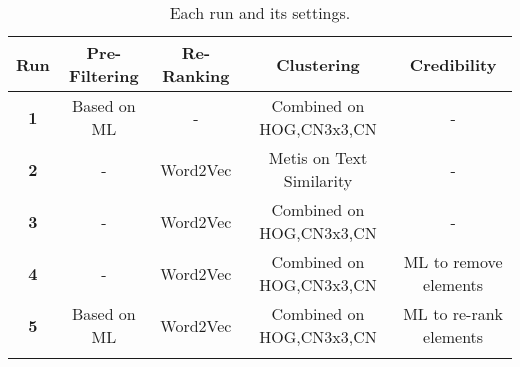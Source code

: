 
\begin{table*}[htb]
\centering
\scriptsize
\caption{Each run and its settings.}
\vspace{-0.25cm}
\label{table:config}
\begin{tabular}{c|c|c|c|c}
\toprule 
\textbf{Run} & \textbf{Pre-Filtering} & \textbf{Re-Ranking} & \textbf{Clustering} & \textbf{Credibility}\tabularnewline
\midrule
\textbf{1} & Based on ML & - & Combined on HOG,CN3x3,CN & -\tabularnewline
\textbf{2} & - & Word2Vec & Metis on Text Similarity & -\tabularnewline
\textbf{3} & - & Word2Vec & Combined on HOG,CN3x3,CN & -\tabularnewline
\textbf{4} & - & Word2Vec & Combined on HOG,CN3x3,CN & ML to remove elements\tabularnewline
\textbf{5} & Based on ML & Word2Vec & Combined on HOG,CN3x3,CN & ML to re-rank elements\tabularnewline
\bottomrule 
\vspace{-0.25cm}
\end{tabular}
\end{table*}


